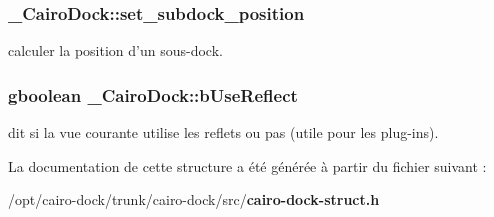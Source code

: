 \subsubsection{ {\bf \_\-CairoDock::set\_\-subdock\_\-position}}\label{struct__CairoDock_98f2d017465563550de31aa4fe1f491d}


calculer la position d'un sous-dock. 

\subsubsection{\setlength{\rightskip}{0pt plus 5cm}gboolean {\bf \_\-CairoDock::bUseReflect}}\label{struct__CairoDock_fef9a496c9a10f1ef83c4a4a4f4c5cc3}


dit si la vue courante utilise les reflets ou pas (utile pour les plug-ins). 



La documentation de cette structure a été générée à partir du fichier suivant :\begin{CompactItemize}
\item 
/opt/cairo-dock/trunk/cairo-dock/src/{\bf cairo-dock-struct.h}\end{CompactItemize}
